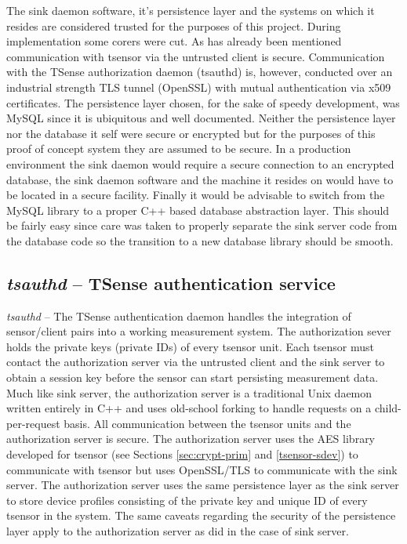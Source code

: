 The sink daemon software, it's persistence layer and the systems on which it resides are considered trusted for the purposes of this project. During implementation some corers were cut. As has already been mentioned communication with tsensor via the untrusted client is secure. Communication with the TSense authorization daemon (tsauthd) is, however, conducted over an industrial strength TLS tunnel (OpenSSL) with mutual authentication via x509 certificates. The persistence layer chosen, for the sake of speedy development, was MySQL since it is ubiquitous and well documented. Neither the persistence layer nor the database it self were secure or encrypted but for the purposes of this proof of concept system they are assumed to be secure. In a production environment the sink daemon would require a secure connection to an encrypted database, the sink daemon software and the machine it resides on would have to be located in a secure facility. Finally it would be advisable to switch from the MySQL library to a proper C++ based database abstraction layer. This should be fairly easy since care was taken to properly separate the sink server code from the database code so the transition to a new database library should be smooth.

\subsection{\textit{tsauthd} -- TSense authentication service}
\label{sec:tsauthd-description}

\textit{tsauthd} -- The TSense authentication daemon handles the integration of sensor/client pairs into a working measurement system. The authorization sever holds the private keys (private IDs) of every tsensor unit. Each tsensor must contact the authorization server via the untrusted client and the sink server to obtain a session key before the sensor can start persisting measurement data.  Much like sink server, the authorization server is a traditional Unix daemon written  entirely in C++ and uses old-school forking to handle requests on a child-per-request basis. All communication between the tsensor units and the authorization server is secure.  The authorization server uses the AES library developed for tsensor (see Sections \ref{sec:crypt-prim} and \ref{tsensor-sdev}) to communicate with tsensor but uses OpenSSL/TLS to communicate with the sink server. The authorization server uses the same persistence layer as the sink server to store device profiles consisting of the private key and unique ID of every tsensor in the system. The same caveats regarding the security of the persistence layer apply to the authorization server as did in the case of sink server.\\ 


